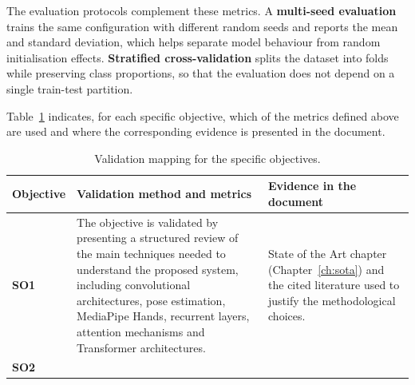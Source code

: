 The evaluation protocols complement these metrics. A \textbf{multi-seed evaluation} trains the same
configuration with different random seeds and reports the mean and standard deviation, which helps
separate model behaviour from random initialisation effects. \textbf{Stratified cross-validation}
splits the dataset into folds while preserving class proportions, so that the evaluation does not
depend on a single train-test partition.

Table~\ref{tab:objective_validation} indicates, for each specific objective, which of the metrics
defined above are used and where the corresponding evidence is presented in the document.

\begin{table}[!htbp]
    \centering
    \small
    \renewcommand{\arraystretch}{1.25}
    \caption{Validation mapping for the specific objectives.}
    \label{tab:objective_validation}
    \begin{tabular}{@{}p{1.3cm} p{5.8cm} p{5.6cm}@{}}
        \toprule
        \textbf{Objective}                                                                                                                                                                                                                                                                         & \textbf{Validation method and metrics} & \textbf{Evidence in the document} \\
        \midrule
        \textbf{SO1}                                                                                                                                                                                                                                                                               &
        The objective is validated by presenting a structured review of the main techniques needed to understand the proposed system, including convolutional architectures, pose estimation, MediaPipe Hands, recurrent layers, attention mechanisms and Transformer architectures.               &
        State of the Art chapter (Chapter~\ref{ch:sota}) and the cited literature used to justify the methodological choices.                                                                                                                                                                                                                                                   \\
        \addlinespace
        \textbf{SO2}                                                                                                                                                                                                                                                                               &

\end{tabular}
\end{table}
